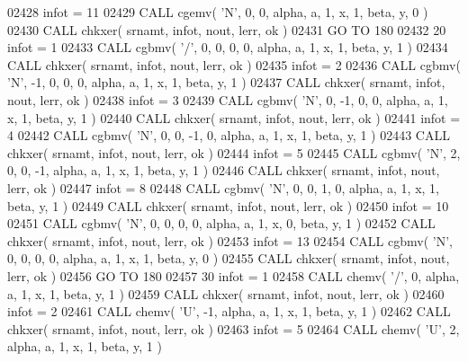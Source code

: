 \begin{DoxyCode}
02428       infot = 11
02429       \textcolor{keyword}{CALL }cgemv( \textcolor{stringliteral}{'N'}, 0, 0, alpha, a, 1, x, 1, beta, y, 0 )
02430       \textcolor{keyword}{CALL }chkxer( srnamt, infot, nout, lerr, ok )
02431       \textcolor{keywordflow}{GO TO} 180
02432    20 infot = 1
02433       \textcolor{keyword}{CALL }cgbmv( \textcolor{stringliteral}{'/'}, 0, 0, 0, 0, alpha, a, 1, x, 1, beta, y, 1 )
02434       \textcolor{keyword}{CALL }chkxer( srnamt, infot, nout, lerr, ok )
02435       infot = 2
02436       \textcolor{keyword}{CALL }cgbmv( \textcolor{stringliteral}{'N'}, -1, 0, 0, 0, alpha, a, 1, x, 1, beta, y, 1 )
02437       \textcolor{keyword}{CALL }chkxer( srnamt, infot, nout, lerr, ok )
02438       infot = 3
02439       \textcolor{keyword}{CALL }cgbmv( \textcolor{stringliteral}{'N'}, 0, -1, 0, 0, alpha, a, 1, x, 1, beta, y, 1 )
02440       \textcolor{keyword}{CALL }chkxer( srnamt, infot, nout, lerr, ok )
02441       infot = 4
02442       \textcolor{keyword}{CALL }cgbmv( \textcolor{stringliteral}{'N'}, 0, 0, -1, 0, alpha, a, 1, x, 1, beta, y, 1 )
02443       \textcolor{keyword}{CALL }chkxer( srnamt, infot, nout, lerr, ok )
02444       infot = 5
02445       \textcolor{keyword}{CALL }cgbmv( \textcolor{stringliteral}{'N'}, 2, 0, 0, -1, alpha, a, 1, x, 1, beta, y, 1 )
02446       \textcolor{keyword}{CALL }chkxer( srnamt, infot, nout, lerr, ok )
02447       infot = 8
02448       \textcolor{keyword}{CALL }cgbmv( \textcolor{stringliteral}{'N'}, 0, 0, 1, 0, alpha, a, 1, x, 1, beta, y, 1 )
02449       \textcolor{keyword}{CALL }chkxer( srnamt, infot, nout, lerr, ok )
02450       infot = 10
02451       \textcolor{keyword}{CALL }cgbmv( \textcolor{stringliteral}{'N'}, 0, 0, 0, 0, alpha, a, 1, x, 0, beta, y, 1 )
02452       \textcolor{keyword}{CALL }chkxer( srnamt, infot, nout, lerr, ok )
02453       infot = 13
02454       \textcolor{keyword}{CALL }cgbmv( \textcolor{stringliteral}{'N'}, 0, 0, 0, 0, alpha, a, 1, x, 1, beta, y, 0 )
02455       \textcolor{keyword}{CALL }chkxer( srnamt, infot, nout, lerr, ok )
02456       \textcolor{keywordflow}{GO TO} 180
02457    30 infot = 1
02458       \textcolor{keyword}{CALL }chemv( \textcolor{stringliteral}{'/'}, 0, alpha, a, 1, x, 1, beta, y, 1 )
02459       \textcolor{keyword}{CALL }chkxer( srnamt, infot, nout, lerr, ok )
02460       infot = 2
02461       \textcolor{keyword}{CALL }chemv( \textcolor{stringliteral}{'U'}, -1, alpha, a, 1, x, 1, beta, y, 1 )
02462       \textcolor{keyword}{CALL }chkxer( srnamt, infot, nout, lerr, ok )
02463       infot = 5
02464       \textcolor{keyword}{CALL }chemv( \textcolor{stringliteral}{'U'}, 2, alpha, a, 1, x, 1, beta, y, 1 )

\end{DoxyCode}
